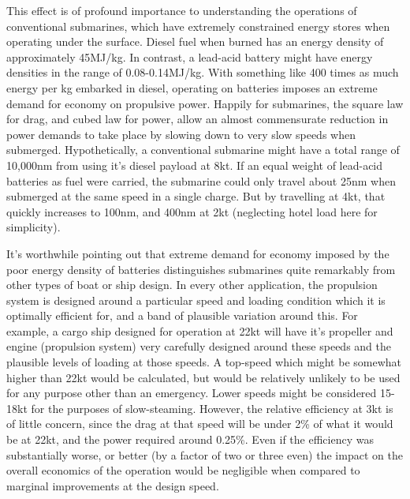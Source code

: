 \documentclass{article}\usepackage[]{graphicx}\usepackage[]{color}
\begin{document}
This effect is of profound importance to understanding the operations of conventional submarines, which have extremely constrained energy stores when operating under the surface. Diesel fuel when burned has an energy density of approximately 45MJ/kg.  In contrast, a lead-acid battery might have energy densities in the range of 0.08-0.14MJ/kg. With something like 400 times as much energy per kg embarked in diesel, operating on batteries imposes an extreme demand for economy on propulsive power.  Happily for submarines, the square law for drag, and cubed law for power, allow an almost commensurate reduction in power demands to take place by slowing down to very slow speeds when submerged. Hypothetically, a conventional submarine might have a total range of 10,000nm from using it's diesel payload at 8kt.  If an equal weight of lead-acid batteries as fuel were carried, the submarine could only travel about 25nm when submerged at the same speed in a single charge.  But by travelling at 4kt, that quickly increases to 100nm, and 400nm at 2kt (neglecting hotel load here for simplicity).

It's worthwhile pointing out that extreme demand for economy imposed by the poor energy density of batteries distinguishes submarines quite remarkably from other types of boat or ship design.  In every other application, the propulsion system is designed around a particular speed and loading condition which it is optimally efficient for, and a band of plausible variation around this.  For example, a cargo ship designed for operation at 22kt will have it's propeller and engine (propulsion system) very carefully designed around these speeds and the plausible levels of loading at those speeds. A top-speed which might be somewhat higher than 22kt would be calculated, but would be relatively unlikely to be used for any purpose other than an emergency.  Lower speeds might be considered 15-18kt for the purposes of slow-steaming.  However, the relative efficiency at 3kt is of little concern, since the drag at that speed will be under 2\% of what it would be at 22kt, and the power required around 0.25\%.  Even if the efficiency was substantially worse, or better (by a factor of two or three even) the impact on the overall economics of the operation would be negligible when compared to marginal improvements at the design speed.
\end{document}
